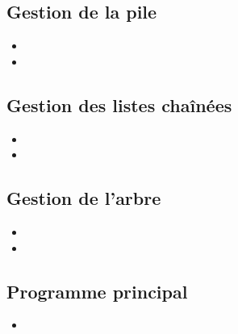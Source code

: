 \subsection{Gestion de la pile}
  \begin{itemize}
	\item {}
	\item {}
  \end{itemize}

\subsection{Gestion des listes chaînées}
  \begin{itemize}
    \item {}
    \item {}
  \end{itemize}

\subsection{Gestion de l'arbre}
  \begin{itemize}
    \item {}
    \item {}
  \end{itemize}
  
\subsection{Programme principal}
  \begin{itemize}
    \item {}
  \end{itemize}
